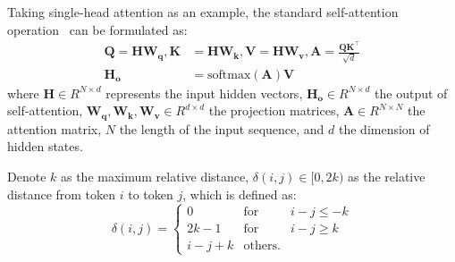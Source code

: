 

Taking single-head attention as an example, the standard self-attention operation~\citep{vaswani2017attention} can be formulated as:  
\begin{align*}
    \bm{Q} =  \bm{H} \bm{W_q} ,    \bm{K} &=  \bm{H} \bm{W_k}, \bm{V} =  \bm{H} \bm{W_v},    \bm{A} = \frac{\bm{Q}\bm{K^{\intercal}}}{\sqrt{d}} \\
    \bm{H_o}&= \text{softmax}(\bm{A})\bm{V}
\end{align*}  
where $\bm{H} \in R^{N \times d}$ represents the input hidden vectors, $\bm{H_o} \in R^{N \times d}$ the output of self-attention, $\bm{W_q},\bm{W_k},\bm{W_v} \in R^{d \times d}$ the projection matrices, $\bm{A} \in R^{N \times N}$ the attention matrix, $N$ the length of the input sequence, and $d$ the dimension of hidden states.

Denote $k$ as the maximum relative distance,
$\delta(i,j) \in [0,2k)$ as the relative distance from token $i$ to token $j$, which is defined as:
\begin{equation}
\label{dist}
\delta(i,j) = \left\{ \begin{array}{rcl}
     0 & \mbox{for} & i-j \leq  -k\\
     2k-1 & \mbox{for} & i-j \geq k \\
     i-j+k & \mbox{others}.
\end{array}\right. 
\end{equation}

